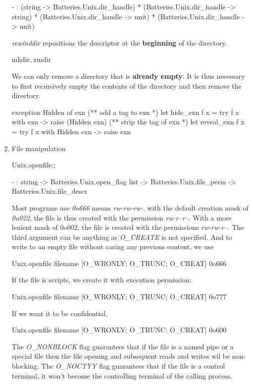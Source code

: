 \begin{enumerate}
\begin{ocamlcode}
- : (string -> Batteries.Unix.dir_handle) *
    (Batteries.Unix.dir_handle -> string) *
    (Batteries.Unix.dir_handle -> unit) * (Batteries.Unix.dir_handle -> unit)  
  \end{ocamlcode}

  \textit{rewinddir} repositions the descriptor at the \textbf{beginning} of
  the directory.

  \begin{ocamlcode}
    mkdir, rmdir
  \end{ocamlcode}
  We can only remove a directory that is \textbf{already empty}. It is
  thus necessary to first recursively empty the contents of the
  directory and then remove the directory.

  \begin{ocamlcode}
exception Hidden of exn 
(** add a tag to exn *)
let hide_exn f x = try f x with exn -> raise (Hidden exn)
(** strip the tag of exn *)
let reveal_exn f x = try f x with Hidden exn -> raise exn 
\end{ocamlcode}
\item  File manipulation \\

  \begin{alternate}
Unix.openfile;;    
\end{alternate}

\begin{ocamlcode}
- : string ->
    Batteries.Unix.open_flag list ->
    Batteries.Unix.file_perm -> Batteries.Unix.file_descr
  \end{ocamlcode}
  Most programs use \textit{0o666} means \textit{rw-rw-rw-}. with the default
  creation mask of \textit{0o022}, the file is thus created with the permission
  \textit{rw-r--r--}. With a more lenient mask of 0o002, the file is
  created with the permissions \textit{rw-rw-r--}. The third argument
  can be anything as \textit{O\_CREATE} is not specified.
  And to write to an empty file without caring any previous content,
  we use
  \begin{ocamlcode}
    Unix.openfile filename [O_WRONLY; O_TRUNC; O_CREAT] 0o666
  \end{ocamlcode}
  If the file is scripts, we create it with execution permission:
  \begin{ocamlcode}
    Unix.openfile filename [O_WRONLY; O_TRUNC; O_CREAT] 0o777
  \end{ocamlcode}
  If we want it to be confidential,
  \begin{ocamlcode}
    Unix.openfile filename [O_WRONLY; O_TRUNC; O_CREAT] 0o600
  \end{ocamlcode}
  The \textit{O\_NONBLOCK} flag guarantees that if the file is a named pipe or a
  special file then the file opening and subsequent reads and writes
  wil be non-blocking. The \textit{O\_NOCTYY} flag guarantees that if
  the file is a control terminal, it won't become the controlling
  terminal of the calling process.


\end{enumerate}
